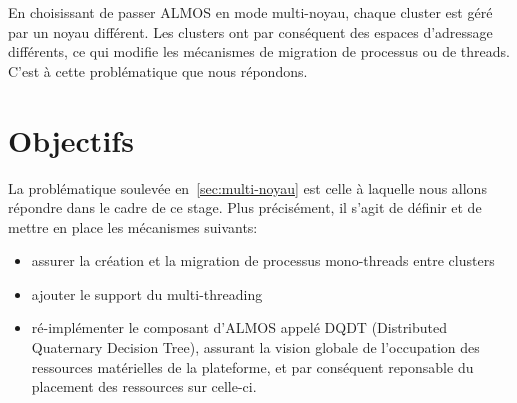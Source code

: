     En choisissant de passer ALMOS en mode multi-noyau, chaque cluster est géré
    par un noyau différent. Les clusters ont par conséquent des espaces
    d'adressage différents, ce qui modifie les mécanismes de migration de
    processus ou de threads. C'est à cette problématique que nous répondons.


  \section{Objectifs}

    La problématique soulevée en~\ref{sec:multi-noyau} est celle à laquelle nous
    allons répondre dans le cadre de ce stage. Plus précisément, il s'agit de
    définir et de mettre en place les mécanismes suivants:

    \begin{itemize}
      \item assurer la création et la migration de processus mono-threads entre
        clusters
      \item ajouter le support du multi-threading
      \item ré-implémenter le composant d'ALMOS appelé DQDT (Distributed
        Quaternary Decision Tree), assurant la vision globale de l'occupation
        des ressources matérielles de la plateforme, et par conséquent
        reponsable du placement des ressources sur celle-ci.
    \end{itemize}
